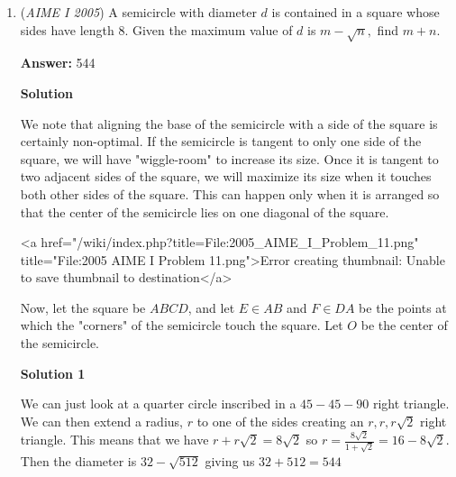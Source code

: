 \begin{enumerate}
 



\textbf{Solution 4}

Plug points into the \href{https://artofproblemsolving.com/wiki/index.php?title=Shoelace\_Theorem}{Shoelace Theorem}. This will provide you with the equation $|-p - 197 + 11q| = 140$. The find the midpoint of the line $BC$ which is $(17.5,19.5)$. Now using this post and the given slope of the median, $-5$, using basic algebra we can find the equation of the median which is $q = -5p + 107$. Now that we have been given $q$ in terms of $p$ plug this equation back into $|-p - 197 + 11q| = 140$. The result is the equation $|980 - 56p| = 140$. Solve this equation for two possible answers $p = 15, 20$. Plugging into $q = -5p + 107$ these inputs produce $q$ values $32$ and $7$. Obviously $15 + 32$ is the greater sum so the answer is $47$ and we are done.

 


	\item (\textit{AIME I 2005}) A semicircle with diameter $d$ is contained in a square whose sides have length 8. Given the maximum value of $d$ is $m - \sqrt{n},$ find $m+n.$

 \textbf{Answer: }544



\textbf{Solution}

We note that aligning the base of the semicircle with a side of the square is certainly non-optimal.  If the semicircle is tangent to only one side of the square, we will have "wiggle-room" to increase its size.  Once it is tangent to two adjacent sides of the square, we will maximize its size when it touches both other sides of the square.  This can happen only when it is arranged so that the center of the semicircle lies on one diagonal of the square.

 <a href="/wiki/index.php?title=File:2005\_AIME\_I\_Problem\_11.png" title="File:2005 AIME I Problem 11.png">Error creating thumbnail: Unable to save thumbnail to destination</a>

 Now, let the square be $ABCD$, and let $E \in AB$ and $F \in DA$ be the points at which the "corners" of the semicircle touch the square. Let $O$ be the center of the semicircle.

 



\textbf{Solution 1}

We can just look at a quarter circle inscribed in a $45-45-90$ right triangle. We can then extend a radius, $r$ to one of the sides creating an $r,r, r\sqrt{2}$ right triangle. This means that we have $r + r\sqrt{2} = 8\sqrt{2}$ so $r = \frac{8\sqrt{2}}{1+\sqrt{2}} = 16 - 8\sqrt{2}$. Then the diameter is $32 - \sqrt{512}$ giving us $32 + 512 = \boxed{544}$





\end{enumerate}
